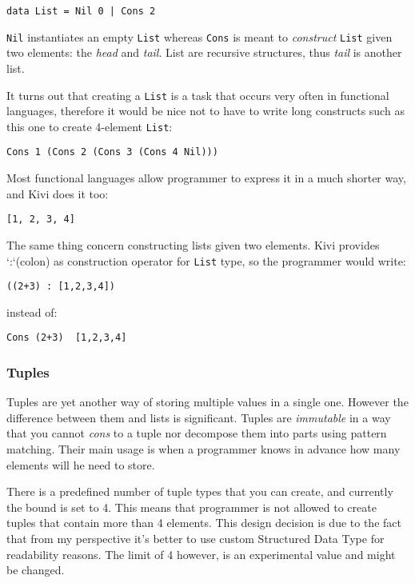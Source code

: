 \documentclass[a4paper]{report}
\begin{document}
\begin{lstlisting}
data List = Nil 0 | Cons 2
\end{lstlisting}

\texttt{Nil} instantiates an empty \texttt{List} whereas \texttt{Cons} is meant
to \textit{construct} \texttt{List} given two elements: the \textit{head} and
\textit{tail}. List are recursive structures, thus \textit{tail} is another
list.

It turns out that creating a \texttt{List} is a task that occurs very often in
functional languages, therefore it would be nice not to have to write long
constructs such as this one to create 4-element \texttt{List}:

\begin{lstlisting}
Cons 1 (Cons 2 (Cons 3 (Cons 4 Nil)))
\end{lstlisting}

Most functional languages allow programmer to express it in a much shorter way,
and Kivi does it too:

\begin{lstlisting}
[1, 2, 3, 4]
\end{lstlisting}

The same thing concern constructing lists given two elements. Kivi provides
`:`(colon) as construction operator for \texttt{List} type, so the programmer
would write:

\begin{lstlisting}
((2+3) : [1,2,3,4])
\end{lstlisting}
instead of:

\begin{lstlisting}
Cons (2+3)  [1,2,3,4]
\end{lstlisting}

\subsubsection{Tuples}
Tuples are yet another way of storing multiple values in a single one. However
the difference between them and lists is significant. Tuples are
\textit{immutable} in a way that you cannot \textit{cons} to a tuple nor
decompose them into parts using pattern matching. Their main usage is when a
programmer knows in advance how many elements will he need to store.

There is a predefined number of tuple types that you can create, and currently
the bound is set to 4. This means that programmer is not allowed to create
tuples that contain more than 4 elements. This design decision is due to the
fact that from my perspective it's better to use custom Structured Data Type
for readability reasons. The limit of 4 however, is an experimental value and
might be changed.
\end{document}
